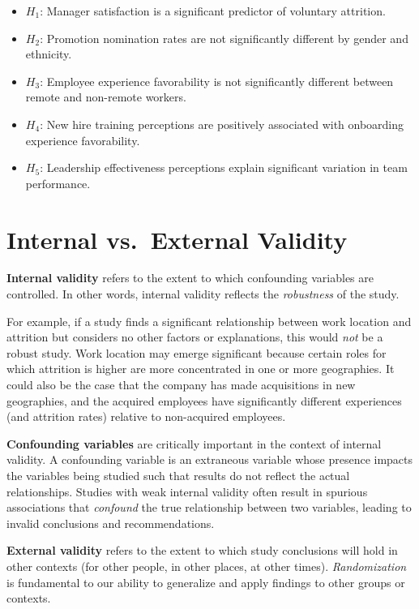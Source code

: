 \documentclass[]{book}
\providecommand{\tightlist}{%
  \setlength{\itemsep}{0pt}\setlength{\parskip}{0pt}}
\begin{document}
\begin{itemize}
\tightlist
\item
  \(H_1\): Manager satisfaction is a significant predictor of voluntary attrition.
\item
  \(H_2\): Promotion nomination rates are not significantly different by gender and ethnicity.
\item
  \(H_3\): Employee experience favorability is not significantly different between remote and non-remote workers.
\item
  \(H_4\): New hire training perceptions are positively associated with onboarding experience favorability.
\item
  \(H_5\): Leadership effectiveness perceptions explain significant variation in team performance.
\end{itemize}

\hypertarget{internal-vs.external-validity}{%
\section{Internal vs.~External Validity}\label{internal-vs.external-validity}}

\textbf{Internal validity} refers to the extent to which confounding variables are controlled. In other words, internal validity reflects the \emph{robustness} of the study.

For example, if a study finds a significant relationship between work location and attrition but considers no other factors or explanations, this would \emph{not} be a robust study. Work location may emerge significant because certain roles for which attrition is higher are more concentrated in one or more geographies. It could also be the case that the company has made acquisitions in new geographies, and the acquired employees have significantly different experiences (and attrition rates) relative to non-acquired employees.

\textbf{Confounding variables} are critically important in the context of internal validity. A confounding variable is an extraneous variable whose presence impacts the variables being studied such that results do not reflect the actual relationships. Studies with weak internal validity often result in spurious associations that \emph{confound} the true relationship between two variables, leading to invalid conclusions and recommendations.

\textbf{External validity} refers to the extent to which study conclusions will hold in other contexts (for other people, in other places, at other times). \emph{Randomization} is fundamental to our ability to generalize and apply findings to other groups or contexts.
\end{document}
